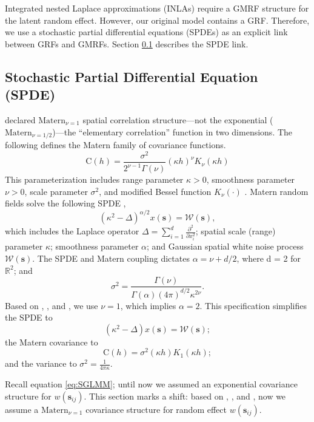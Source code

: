 Integrated nested Laplace approximations (INLAs) require a GMRF structure for the latent random effect. However, our original model contains a GRF. Therefore, we use a stochastic partial differential equations (SPDEs) as an explicit link between GRFs and GMRFs. Section \ref{SPDE} describes the SPDE link. 

\subsection{Stochastic Partial Differential Equation (SPDE)} \label{SPDE}

\cite{Whittle1954} declared $\text{Matern}_{\nu = 1}$ spatial correlation structure---not the exponential ($\text{Matern}_{\nu = 1/2}$)---the ``elementary correlation'' function in two dimensions. The following defines the Matern family of covariance functions.
$$\text{C}(h) = \frac{\sigma^{2}}{2^{\nu - 1}\Gamma(\nu)}(\kappa h)^{\nu}K_{\nu}(\kappa h)$$
This parameterization includes range parameter $\kappa > 0$, smoothness parameter $\nu > 0$, scale parameter $\sigma^{2}$, and modified Bessel function $K_{\nu}(\cdot)$ \citep{Schabenberger2004}. Matern random fields solve the following SPDE \citep{Whittle1954},
\begin{equation} \label{eq:spde1}
(\kappa^{2} - \Delta)^{\alpha/2}x(\pmb{s}) = \mathcal{W}(\pmb{s}),
\end{equation}
which includes the Laplace operator $\Delta = \sum_{i=1}^{d} \frac{\partial^{2}}{\partial x_{i}^{2}}$; spatial scale (range) parameter $\kappa$; smoothness parameter $\alpha$; and Gaussian spatial white noise process $\mathcal{W}(\pmb{s})$. The SPDE and Matern coupling dictates $\alpha = \nu + d/2$, where d = 2 for $\mathbb{R}^{2}$; and $$\sigma^{2} = \frac{\Gamma(\nu)}{\Gamma(\alpha)(4\pi)^{d/2}\kappa^{2\nu}}.$$
Based on \citep{Whittle1954}, \citep{Mondal2017}, and \citep{Lindgren2015}, we use $\nu = 1$, which implies $\alpha = 2$. This specification simplifies the SPDE to 
\begin{equation} \label{eq:spde}
(\kappa^{2} - \Delta)x(\pmb{s}) = \mathcal{W}(\pmb{s});
\end{equation}
the Matern covariance to 
\begin{equation} \label{eq:matern}
\text{C}(h) = \sigma^{2}(\kappa h)K_{1}(\kappa h);
\end{equation}
and the variance to $\sigma^{2} = \frac{1}{4 \pi \kappa}$.

Recall equation \ref{eq:SGLMM}; until now we assumed an exponential covariance structure for $w(\pmb{s}_{ij})$. This section marks a shift: based on \citep{Whittle1954}, \citep{Mondal2017}, and \citep{Lindgren2015}, now we assume a $\text{Matern}_{\nu = 1}$ covariance structure for random effect $w(\pmb{s}_{ij})$. 

